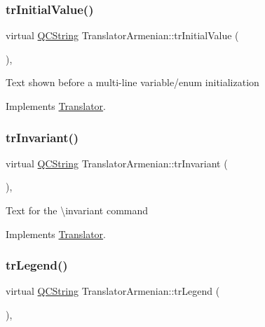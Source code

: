 \subsubsection{\texorpdfstring{trInitialValue()}{trInitialValue()}}
{\footnotesize\ttfamily virtual \mbox{\hyperlink{class_q_c_string}{Q\+C\+String}} Translator\+Armenian\+::tr\+Initial\+Value (\begin{DoxyParamCaption}{ }\end{DoxyParamCaption})\hspace{0.3cm}{\ttfamily [inline]}, {\ttfamily [virtual]}}

Text shown before a multi-\/line variable/enum initialization 

Implements \mbox{\hyperlink{class_translator}{Translator}}.

\mbox{\label{class_translator_armenian_a60c41be9818529afd4c7b3918693d701}} 
\subsubsection{\texorpdfstring{trInvariant()}{trInvariant()}}
{\footnotesize\ttfamily virtual \mbox{\hyperlink{class_q_c_string}{Q\+C\+String}} Translator\+Armenian\+::tr\+Invariant (\begin{DoxyParamCaption}{ }\end{DoxyParamCaption})\hspace{0.3cm}{\ttfamily [inline]}, {\ttfamily [virtual]}}

Text for the \textbackslash{}invariant command 

Implements \mbox{\hyperlink{class_translator}{Translator}}.

\mbox{\label{class_translator_armenian_a0eefd2c6a37a02e831a56f7abbc12364}} 
\subsubsection{\texorpdfstring{trLegend()}{trLegend()}}
{\footnotesize\ttfamily virtual \mbox{\hyperlink{class_q_c_string}{Q\+C\+String}} Translator\+Armenian\+::tr\+Legend (\begin{DoxyParamCaption}{ }\end{DoxyParamCaption})\hspace{0.3cm}{\ttfamily [inline]}, {\ttfamily [virtual]}}

